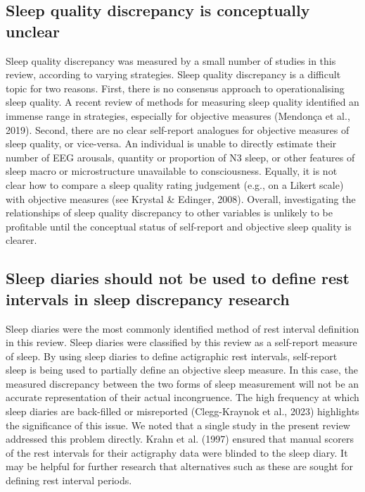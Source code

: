 \documentclass[
]{article}
\begin{document}
\subsection{Sleep quality discrepancy is conceptually unclear}\label{sleep-quality-discrepancy-is-conceptually-unclear}

Sleep quality discrepancy was measured by a small number of studies in this review, according to varying strategies. Sleep quality discrepancy is a difficult topic for two reasons. First, there is no consensus approach to operationalising sleep quality. A recent review of methods for measuring sleep quality identified an immense range in strategies, especially for objective measures (Mendonça et al., 2019). Second, there are no clear self-report analogues for objective measures of sleep quality, or vice-versa. An individual is unable to directly estimate their number of EEG arousals, quantity or proportion of N3 sleep, or other features of sleep macro or microstructure unavailable to consciousness. Equally, it is not clear how to compare a sleep quality rating judgement (e.g., on a Likert scale) with objective measures (see Krystal \& Edinger, 2008). Overall, investigating the relationships of sleep quality discrepancy to other variables is unlikely to be profitable until the conceptual status of self-report and objective sleep quality is clearer.

\subsection{Sleep diaries should not be used to define rest intervals in sleep discrepancy research}\label{actidiary}

Sleep diaries were the most commonly identified method of rest interval definition in this review. Sleep diaries were classified by this review as a self-report measure of sleep. By using sleep diaries to define actigraphic rest intervals, self-report sleep is being used to partially define an objective sleep measure. In this case, the measured discrepancy between the two forms of sleep measurement will not be an accurate representation of their actual incongruence. The high frequency at which sleep diaries are back-filled or misreported (Clegg-Kraynok et al., 2023) highlights the significance of this issue. We noted that a single study in the present review addressed this problem directly. Krahn et al. (1997) ensured that manual scorers of the rest intervals for their actigraphy data were blinded to the sleep diary. It may be helpful for further research that alternatives such as these are sought for defining rest interval periods.
\end{document}
